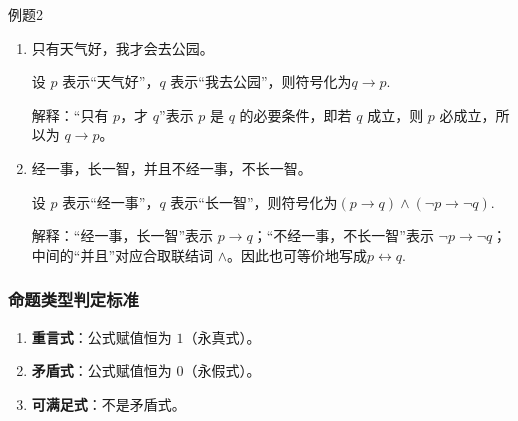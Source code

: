 \begin{question}{例题2}
\begin{enumerate}
		\item 只有天气好，我才会去公园。
		
		设 $p$ 表示“天气好”，$q$ 表示“我去公园”，则符号化为$q\rightarrow p$.
		
		解释：“只有 $p$，才 $q$”表示 $p$ 是 $q$ 的必要条件，即若 $q$ 成立，则 $p$ 必成立，所以为 $q\rightarrow p$。
		
		\item 经一事，长一智，并且不经一事，不长一智。
		
		设 $p$ 表示“经一事”，$q$ 表示“长一智”，则符号化为$(p\rightarrow q)\land(\neg p\rightarrow \neg q)$.
		
		解释：“经一事，长一智”表示 $p\rightarrow q$；“不经一事，不长一智”表示 $\neg p\rightarrow \neg q$；中间的“并且”对应合取联结词 $\land$。因此也可等价地写成$p\leftrightarrow q$.
		
	\end{enumerate}
\end{question}

\subsubsection{命题类型判定标准}
\begin{enumerate}
	\item \textbf{重言式}：公式赋值恒为 $1$（永真式）。
	\item \textbf{矛盾式}：公式赋值恒为 $0$（永假式）。
	\item \textbf{可满足式}：不是矛盾式。
\end{enumerate}



